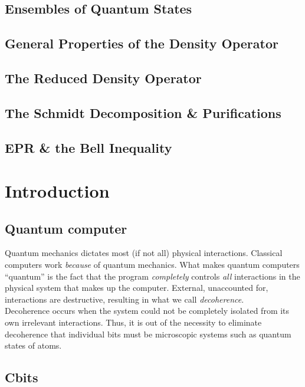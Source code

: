 \documentclass{book}
\theoremstyle{definition}
\begin{document}
\subsection{Ensembles of Quantum States}
\subsection{General Properties of the Density Operator}
\subsection{The Reduced Density Operator}
\subsection{The Schmidt Decomposition \& Purifications}
\subsection{EPR \& the Bell Inequality}

\newpage

\section{Introduction}

\subsection{Quantum computer}

Quantum mechanics dictates most (if not all) physical interactions. Classical computers work \textit{because} of quantum mechanics. What makes quantum computers ``quantum'' is the fact that the program \textit{completely} controls \textit{all} interactions in the physical system that makes up the computer. External, unaccounted for, interactions are destructive, resulting in what we call \textit{decoherence}. \\

Decoherence occurs when the system could not be completely isolated from its own irrelevant interactions. Thus, it is out of the necessity to eliminate decoherence that individual bits must be microscopic systems such as quantum states of atoms. 




\subsection{Cbits}
\end{document}

